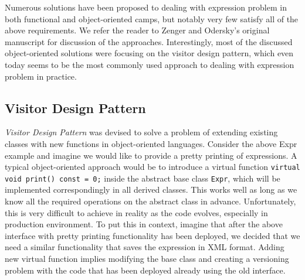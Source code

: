 \documentclass[preprint]{sigplanconf}
\makeatletter
\DeclareRobustCommand{\code}[1]{{\lstinline[breaklines=false,escapechar=@]{#1}}}
\makeatother
\begin{document}

Numerous solutions have been proposed to dealing with expression problem in both 
functional and object-oriented camps, but notably very few satisfy all of the 
above requirements. We refer the reader to Zenger and Odersky's original 
manuscript for discussion of the approaches\cite{fool12}. Interestingly, most of 
the discussed object-oriented solutions were focusing on the visitor design 
pattern, which even today seems to be the most commonly used approach to dealing 
with expression problem in practice.

\subsection{Visitor Design Pattern}
\label{sec:vdp}



\emph{Visitor Design Pattern}\cite{DesignPatterns1993} was devised to solve a problem 
of extending existing classes with new functions in object-oriented languages. 
Consider the above Expr example and imagine we would like to provide a pretty 
printing of expressions. A typical object-oriented approach would be to 
introduce a virtual function \code{virtual void print() const = 0;} inside the 
abstract base class \code{Expr}, which will be implemented correspondingly in all derived 
classes. This works well as long as we know all the required operations on the 
abstract class in advance. Unfortunately, this is very difficult to achieve in 
reality as the code evolves, especially in production environment. To put this 
in context, imagine that after the above interface with pretty printing 
functionality has been deployed, we decided that we need a similar functionality 
that saves the expression in XML format. Adding new virtual function implies 
modifying the base class and creating a versioning problem with the code that 
has been deployed already using the old interface.
\end{document}
